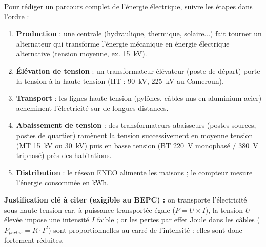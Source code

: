 \documentclass[11pt]{article}
\newcommand{\cle}[1]{{\popxbold\color{popdark}#1}}
\begin{document}
\begin{methode}
Pour rédiger un parcours complet de l'énergie électrique, suivre les étapes dans l'ordre :
\begin{enumerate}
\item \textbf{Production} : une \cle{centrale} (hydraulique, thermique, solaire...) fait tourner un \cle{alternateur} qui transforme l'énergie mécanique en énergie électrique alternative (tension moyenne, ex. \SI{15}{kV}).
\item \textbf{Élévation de tension} : un transformateur \cle{élévateur} (poste de départ) porte la tension à la \cle{haute tension} (HT : \SI{90}{kV}, \SI{225}{kV} au Cameroun).
\item \textbf{Transport} : les \cle{lignes haute tension} (pylônes, câbles nus en aluminium-acier) acheminent l'électricité sur de longues distances.
\item \textbf{Abaissement de tension} : des transformateurs \cle{abaisseurs} (postes sources, postes de quartier) ramènent la tension successivement en moyenne tension (MT \SI{15}{kV} ou \SI{30}{kV}) puis en \cle{basse tension} (BT \SI{220}{V} monophasé / \SI{380}{V} triphasé) près des habitations.
\item \textbf{Distribution} : le réseau ENEO alimente les maisons ; le \cle{compteur} mesure l'énergie consommée en kWh.
\end{enumerate}
\textbf{Justification clé à citer (exigible au BEPC) :} on transporte l'électricité sous haute tension car, à puissance transportée égale ($P = U \times I$), la tension $U$ élevée impose une intensité $I$ faible ; or les pertes par \cle{effet Joule} dans les câbles ($P_{pertes} = R \cdot I^2$) sont proportionnelles au carré de l'intensité : elles sont donc fortement réduites.
\end{methode}
\end{document}
